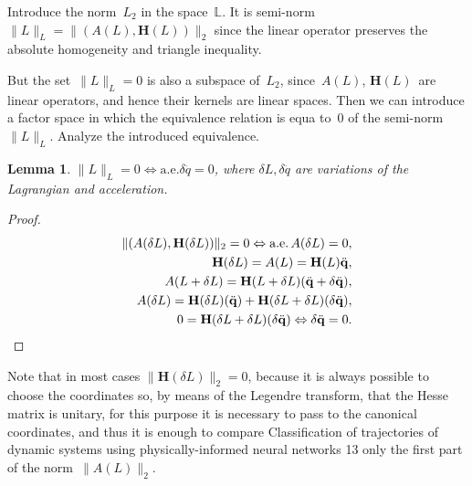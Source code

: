 \documentclass[12pt]{paper}
\newtheorem{lemma}{Lemma}
\newtheorem{proof}{Proof}
\begin{document}
Introduce the norm~$L_2$ in the space~$\mathbb{L}$. It is semi-norm $\|L\|_L = \|(A(L), \mathbf{H}(L))\|_2$ since the linear operator preserves the absolute homogeneity and triangle inequality.

But the set~$\|L\|_L = 0$ is also a subspace of~$L_2$, since~$A(L)$, $\mathbf{H}(L)$~are linear operators, and hence their kernels are linear spaces. Then we can introduce a factor space in which the
equivalence relation is equa to~$0$ of the semi-norm~$\|L\|_L$. Analyze the introduced equivalence.
\begin{lemma} \label{lemmaeq}
$\|L\|_L = 0 \Leftrightarrow \text{a.e.}\delta \ddot{q} = 0$, where $\delta L, \delta \ddot{q}$ are variations of the Lagrangian and acceleration.
\end{lemma}
\begin{proof}
\[
\begin{split}
\|(A(\delta L), \mathbf{H}(\delta L))\|_2 = 0 \Leftrightarrow \text{a.e.\,} A(\delta L) = 0, 
\\ 
\mathbf{H}(\delta L) = A(L) = \mathbf{H}(L)\ddot{\mathbf{q}},
\\
A(L+\delta L) = \mathbf{H}(L+\delta L)(\ddot{\mathbf{q}} + \delta \ddot{\mathbf{q}}),
\\
A(\delta L) = \mathbf{H}(\delta L)(\ddot{\mathbf{q}}) + \mathbf{H}(\delta L+\delta L)(\delta \ddot{\mathbf{q}}),
\\
0 = \mathbf{H}(\delta L+\delta L)(\delta \ddot{\mathbf{q}}) \Leftrightarrow \delta \ddot{\mathbf{q}} = 0.
\end{split}
\]
\end{proof}

Note that in most cases $\|\mathbf{H}(\delta L)\|_2 = 0$, because it is always possible to choose the
coordinates so, by means of the Legendre transform, that the Hesse matrix is unitary, for this
purpose it is necessary to pass to the canonical coordinates, and thus it is enough to compare
Classification of trajectories of dynamic systems using physically-informed neural networks 13
only the first part of the norm~$\|A(L)\|_2$.
\end{document}
